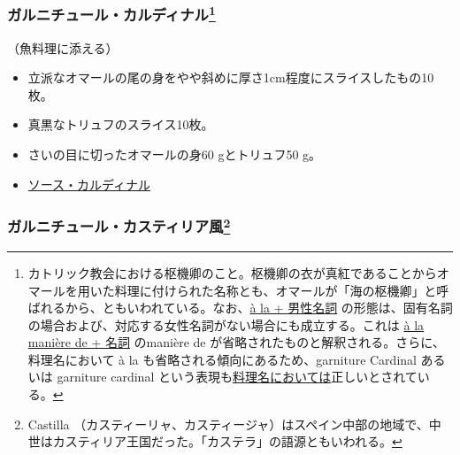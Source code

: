 \begin{recette}
\hypertarget{garniture-cardinal}{%
\subsubsection[ガルニチュール・カルディナル]{\texorpdfstring{ガルニチュール・カルディナル\footnote{カトリック教会における枢機卿のこと。枢機卿の衣が真紅であることからオマールを用いた料理に付けられた名称とも、オマールが「海の枢機卿」と呼ばれるから、ともいわれている。なお、\ul{à la + 男性名詞}
  の形態は、固有名詞の場合および、対応する女性名詞がない場合にも成立する。これは
  \ul{à la manière de + 名詞} のmanière de
  が省略されたものと解釈される。さらに、料理名において à la
  も省略される傾向にあるため、garniture Cardinal あるいは garniture
  cardinal という表現も\ul{料理名においては}正しいとされている。}}{ガルニチュール・カルディナル}}\label{garniture-cardinal}}



（魚料理に添える）

\begin{itemize}
\item
  立派なオマールの尾の身をやや斜めに厚さ1cm程度にスライスしたもの10枚。
\item
  真黒なトリュフのスライス10枚。
\item
  さいの目に切ったオマールの身60 gとトリュフ50 g。
\item
  \protect\hyperlink{sauce-cardinal}{ソース・カルディナル}
\end{itemize}

\hypertarget{garniture-castillane}{%
\subsubsection[ガルニチュール・カスティリア風]{\texorpdfstring{ガルニチュール・カスティリア風\footnote{Castilla
  （カスティーリャ、カスティージャ）はスペイン中部の地域で、中世はカスティリア王国だった。「カステラ」の語源ともいわれる。}}{ガルニチュール・カスティリア風}}\label{garniture-castillane}}




\end{recette}
